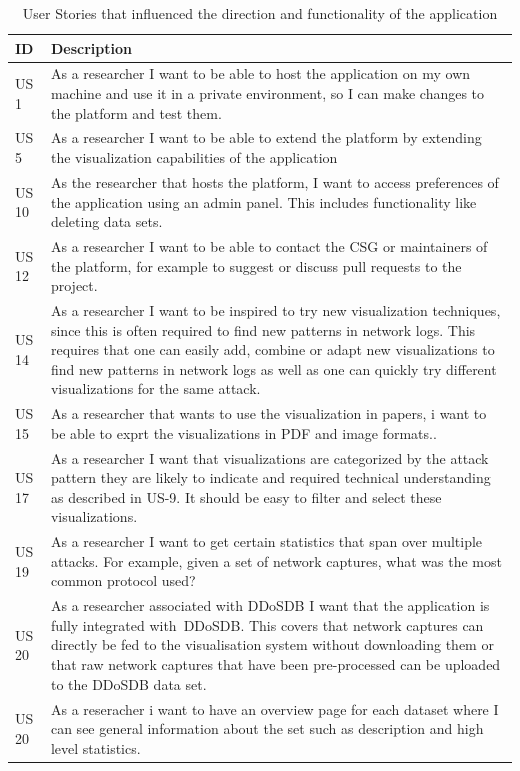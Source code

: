 \begin{table}[]
\centering
\begin{tabular}{|p{1.1cm}|p{12cm}|}
\hline
\textbf{ID} & \textbf{Description} \\ \hline

US 1         & As a researcher I want to be able to host the application on my own machine and use it in a private environment, so I can make changes to the platform and test them.\\ \hline
US 5         & As a researcher I want to be able to extend the platform by extending the visualization capabilities of the application\\ \hline
US 10        & As the researcher that hosts the platform, I want to access preferences of the application using an admin panel. This includes functionality like deleting data sets.\\ \hline
US 12        & As a researcher I want to be able to contact the CSG or maintainers of the platform, for example to suggest or discuss pull requests to the project.\\ \hline
US 14       & As a researcher I want to be inspired to try new visualization techniques, since this is often required to find new patterns in network logs\cite{appliedsecurityvisualizations}. This requires that one can easily add, combine or adapt new visualizations to find new patterns in network logs as well as one can quickly try different visualizations for the same attack.\\ \hline
US 15       & As a researcher that  wants to use the visualization in papers, i want to be able to exprt the visualizations in PDF and image formats.\cite{appliedsecurityvisualizations}.\\ \hline
US 17       & As a researcher I want that visualizations are categorized by the attack pattern they are likely to indicate and required technical understanding as described in US-9. It should be easy to filter and select these visualizations.\\ \hline
US 19       & As a researcher I want to get certain statistics that span over multiple attacks. For example, given a set of network captures, what was the most common protocol used?\\ \hline
US 20      & As a researcher associated with DDoSDB I want that the application is fully integrated with DDoSDB. This covers that network captures can directly be fed to the visualisation system without downloading them or that raw network captures that have been pre-processed can be uploaded to the DDoSDB data set.\\ \hline
US 20      & As a reseracher i want to have an overview page for each dataset where I can see general information about the set such as description and high level statistics.\\ \hline

\end{tabular}
\caption{User Stories that influenced the direction and functionality of the application}
\label{table:1}
\end{table} 

